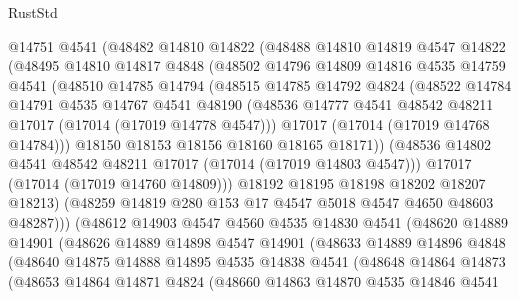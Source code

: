 \begin{lexlean}{RustStd}
\begin{coremodule}
{\begin{coremodule}
{{{{{{{{{{{{{{{{{{{{{{{{{{{{{{{{{{{{{{{{{{{{{{{{{{{{{{{          @14751
          @4541
          (@48482
            @14810
            @14822
            (@48488
              @14810
              @14819
              @4547
              @14822
              (@48495
                @14810
                @14817
                @4848
                (@48502
                  @14796
                  @14809
                  @14816
                  @4535
                  @14759
                  @4541
                  (@48510
                    @14785
                    @14794
                    (@48515
                      @14785
                      @14792
                      @4824
                      (@48522
                        @14784
                        @14791
                        @4535
                        @14767
                        @4541
                        @48190
                        (@48536 @14777 @4541 @48542 @48211 @17017 (@17014 (@17019 @14778 @4547)))
                        @17017
                        (@17014 (@17019 @14768 @14784)))
                      @18150
                      @18153
                      @18156
                      @18160
                      @18165
                      @18171))
                  (@48536 @14802 @4541 @48542 @48211 @17017 (@17014 (@17019 @14803 @4547)))
                  @17017
                  (@17014 (@17019 @14760 @14809)))
                @18192
                @18195
                @18198
                @18202
                @18207
                @18213)
              (@48259 @14819 @280 @153 @17 @4547 @5018 @4547 @4650 @48603 @48287)))
          (@48612
            @14903
            @4547
            @4560
            @4535
            @14830
            @4541
            (@48620
              @14889
              @14901
              (@48626
                @14889
                @14898
                @4547
                @14901
                (@48633
                  @14889
                  @14896
                  @4848
                  (@48640
                    @14875
                    @14888
                    @14895
                    @4535
                    @14838
                    @4541
                    (@48648
                      @14864
                      @14873
                      (@48653
                        @14864
                        @14871
                        @4824
                        (@48660
                          @14863
                          @14870
                          @4535
                          @14846
                          @4541
}}}}}}}}}}}}}}}}}}}}}}}}}}}}}}}}}}}}}}}}}}}}}}}}}}}}}}}
\end{coremodule}}
\end{coremodule}
\end{lexlean}
